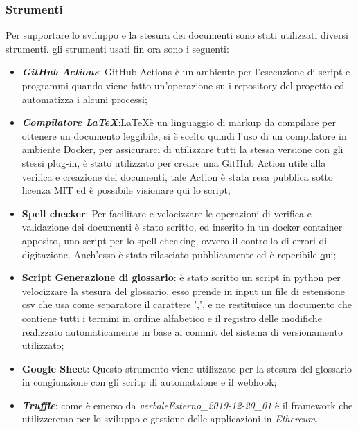\subsubsection{Strumenti}
Per supportare lo sviluppo e la stesura dei documenti sono stati utilizzati diversi
strumenti.
gli strumenti usati fin ora sono i seguenti:
\begin{itemize}
  \item \textbf{\textit{GitHub Actions\glos}}:
  GitHub Actions è un ambiente per l'esecuzione di script e programmi quando viene
  fatto un'operazione su i repository del progetto ed automatizza i alcuni processi;
  \item \textbf{\textit{Compilatore \LaTeX\glos}}:\LaTeX \space è un linguaggio
  di markup da compilare per ottenere un documento leggibile, si è scelto quindi l'uso di un
  \href{https://GitHub.com/dante-ev/docker-texlive}{compilatore} in ambiente Docker\glos,
  per assicurarci di utilizzare tutti la stessa versione con gli stessi plug-in,
  è stato utilizzato per creare una GitHub Action utile
  alla verifica e creazione dei documenti, tale Action è stata resa pubblica sotto licenza MIT
  ed è possibile visionare \href{https://GitHub.com/Jatus93/Latex-multicompiler}qui lo script;
  \item \textbf{Spell checker}:
  Per facilitare e velocizzare le operazioni di verifica e validazione dei documenti è
  stato scritto, ed inserito in un docker container apposito, uno script per lo
  spell checking, ovvero il controllo di errori di digitazione.
  Anch'esso è stato rilasciato pubblicamente ed è reperibile \href{https://GitHub.com/Jatus93/spellCheck}qui;
  \item \textbf{Script Generazione di glossario}: è stato scritto un script in python per velocizzare la stesura
  del glossario, esso prende in input un file di estensione csv che usa come
  separatore il carattere ',', e ne restituisce un documento che contiene tutti i
  termini in ordine alfabetico e il registro delle modifiche realizzato automaticamente
  in base ai commit del sistema di versionamento utilizzato;
  \item \textbf{Google Sheet}: Questo strumento viene utilizzato per la stesura del glossario
  in congiunzione con gli scritp di automatzione e il webhook;
  \item \textbf{\textit{Truffle\glos}}: come è emerso da \textit{verbaleEsterno\_2019-12-20\_01} è il framework che
  utilizzeremo per lo sviluppo e gestione delle applicazioni in \textit{Ethereum\glos}.
\end{itemize}

